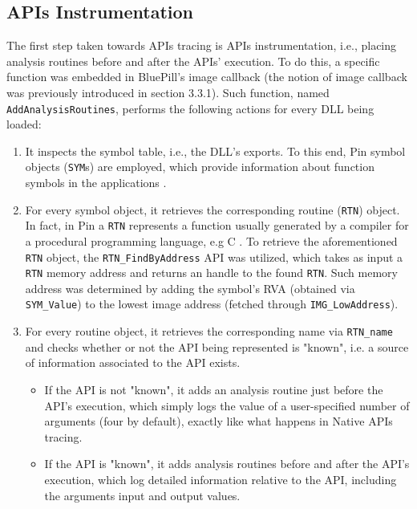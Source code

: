 \subsection{APIs Instrumentation}

The first step taken towards APIs tracing is APIs instrumentation, i.e., placing analysis routines before and after the APIs' execution. To do this, a specific function was embedded in BluePill's image callback (the notion of image callback was previously introduced in section 3.3.1). Such function, named \texttt{AddAnalysisRoutines}, performs the following actions for every DLL being loaded:

\begin{enumerate} 
\item It inspects the symbol table, i.e., the DLL's exports. To this end, Pin symbol objects (\texttt{SYM}s) are employed, which provide information about function symbols in the applications \cite{Pin}.
\item For every symbol object, it retrieves the corresponding routine (\texttt{RTN}) object. In fact, in Pin a \texttt{RTN} represents a function usually generated by a compiler for a procedural programming language, e.g C \cite{Pin}. To retrieve the aforementioned \texttt{RTN} object, the \texttt{RTN\_FindByAddress} API was utilized, which takes as input a \texttt{RTN} memory address and returns an handle to the found \texttt{RTN}. Such memory address was determined by adding the symbol's RVA (obtained via \texttt{SYM\_Value}) to the lowest image address (fetched through \texttt{IMG\_LowAddress}).  
\item For every routine object, it retrieves the corresponding name via \texttt{RTN\_name} and checks whether or not the API being represented is "known", i.e. a source of information associated to the API exists.

\begin{itemize}
\item If the API is not "known", it adds an analysis routine just before the API's execution, which simply logs the value of a user-specified number of arguments (four by default), exactly like what happens in Native APIs tracing.
\item If the API is "known", it adds analysis routines before and after the API's execution, which log detailed information relative to the API, including the arguments input and output values. 
\end{itemize}
 
\end{enumerate}

